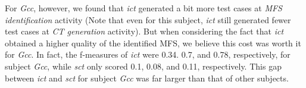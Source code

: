 \documentclass[10pt,journal,compsoc]{IEEEtran}
\begin{document}
For \emph{Gcc}, however, we found that \emph{ict} generated a bit more test cases at \emph{MFS identification} activity (Note that even for this subject, \emph{ict} still generated fewer test cases at \emph{CT generation} activity). But when considering the fact that \emph{ict} obtained a higher quality of the identified MFS, we believe this cost was worth it for \emph{Gcc}. In fact, the f-measures of \emph{ict} were 0.34. 0.7, and 0.78, respectively, for subject \emph{Gcc}, while \emph{sct} only scored 0.1, 0.08, and 0.11, respectively. This gap between \emph{ict} and \emph{sct} for subject \emph{Gcc} was far larger than that of other subjects.






\end{document}
